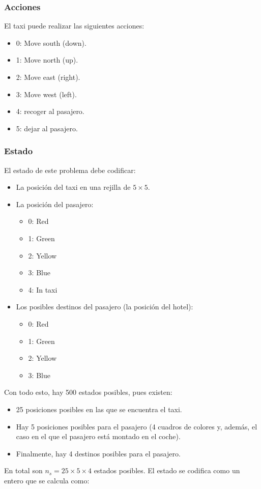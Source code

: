 \documentclass{article}
\begin{document}
\subsubsection{Acciones}
El taxi puede realizar las siguientes acciones:
\begin{itemize}
    \item 0: Move south (down).
    \item 1: Move north (up).
    \item 2: Move east (right).
    \item 3: Move west (left).
    \item 4: recoger al pasajero.
    \item 5: dejar al pasajero.
\end{itemize}

\subsubsection{Estado}
El estado de este problema debe codificar:
\begin{itemize}
    \item La posición del taxi en una rejilla de $5\times 5$.
    \item La posición del pasajero: 
    \begin{itemize}
        \item 0: Red
        \item 1: Green
        \item 2: Yellow
        \item 3: Blue
        \item 4: In taxi
    \end{itemize}
    \item Los posibles destinos del pasajero (la posición del hotel): 
    \begin{itemize}
        \item 0: Red
        \item 1: Green
        \item 2: Yellow
        \item 3: Blue
    \end{itemize}
\end{itemize}

Con todo esto, hay 500 estados posibles, pues existen:
\begin{itemize}
    \item 25 posiciones posibles en las que se encuentra el taxi.
    \item Hay 5 posiciones posibles para el pasajero (4 cuadros de colores y, además, el caso en el que el pasajero está montado en el coche).
    \item Finalmente, hay 4 destinos posibles para el pasajero.
\end{itemize}
En total son $n_s=25\times5\times4$ estados posibles. El estado se codifica como un entero que se calcula como: 
\end{document}
